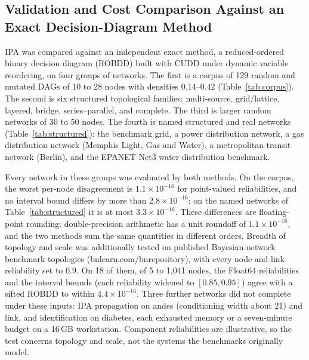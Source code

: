 \documentclass[preprint,12pt]{elsarticle}
\begin{document}
\subsection{Validation and Cost Comparison Against an Exact Decision-Diagram Method}\label{sec:comparison}

IPA was compared against an independent exact method, a reduced-ordered binary decision diagram (ROBDD) built with CUDD under dynamic variable reordering, on four groups of networks. The first is a corpus of 129 random and mutated DAGs of 10 to 28 nodes with densities 0.14--0.42 (Table~\ref{tab:corpus}). The second is six structured topological families: multi-source, grid/lattice, layered, bridge, series--parallel, and complete. The third is larger random networks of 30 to 50 nodes. The fourth is named structured and real networks (Table~\ref{tab:structured}): the benchmark grid, a power distribution network, a gas distribution network (Memphis Light, Gas and Water), a metropolitan transit network (Berlin), and the EPANET Net3 water distribution benchmark.

Every network in these groups was evaluated by both methods. On the corpus, the worst per-node disagreement is $1.1\times10^{-16}$ for point-valued reliabilities, and no interval bound differs by more than $2.8\times10^{-16}$; on the named networks of Table~\ref{tab:structured} it is at most $3.3\times10^{-16}$. These differences are floating-point rounding: double-precision arithmetic has a unit roundoff of $1.1\times10^{-16}$, and the two methods sum the same quantities in different orders. Breadth of topology and scale was additionally tested on published Bayesian-network benchmark topologies (bnlearn.com/bnrepository), with every node and link reliability set to $0.9$. On 18 of them, of 5 to 1{,}041 nodes, the Float64 reliabilities and the interval bounds (each reliability widened to $[0.85,0.95]$) agree with a sifted ROBDD to within $4.4\times10^{-16}$. Three further networks did not complete under these inputs: IPA propagation on andes (conditioning width about 21) and link, and identification on diabetes, each exhausted memory or a seven-minute budget on a 16\,GB workstation. Component reliabilities are illustrative, so the test concerns topology and scale, not the systems the benchmarks originally model.
\end{document}
